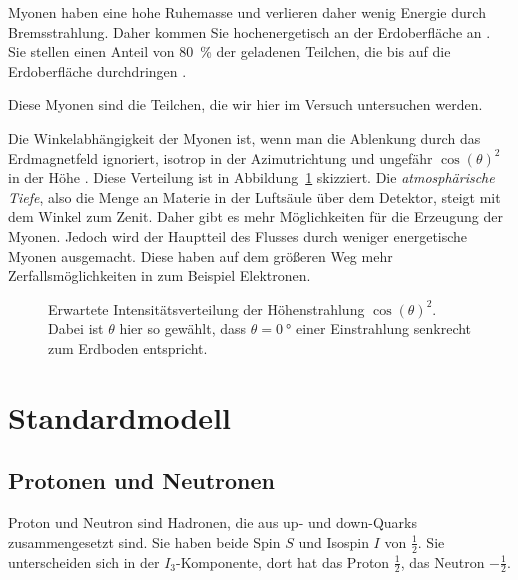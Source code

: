 \documentclass[11pt, ngerman, fleqn, DIV=15, headinclude, BCOR=2cm]{scrreprt}
\begin{document}
Myonen haben eine hohe Ruhemasse und verlieren
daher wenig Energie durch Bremsstrahlung. Daher kommen Sie hochenergetisch an
der Erdoberfläche an \parencite[984]{meschede-gerthsen_24}. Sie stellen einen
Anteil von \SI{80}{\percent} der geladenen Teilchen, die bis auf die
Erdoberfläche durchdringen \parencite[111]{Grupen/Astroteilchenphysik}.

Diese Myonen sind die Teilchen, die wir hier im Versuch untersuchen werden.

Die Winkelabhängigkeit der Myonen ist, wenn man die Ablenkung durch das
Erdmagnetfeld ignoriert, isotrop in der Azimutrichtung und ungefähr
$\cos(\theta)^2$ in der Höhe \parencite[(7.2)]{Grupen/Astroteilchenphysik}.
Diese Verteilung ist in Abbildung~\ref{fig:cos2} skizziert. Die
\emph{atmosphärische Tiefe}, also die Menge an Materie in der Luftsäule über
dem Detektor, steigt mit dem Winkel zum Zenit. Daher gibt es mehr Möglichkeiten
für die Erzeugung der Myonen. Jedoch wird der Hauptteil des Flusses durch
weniger energetische Myonen ausgemacht. Diese haben auf dem größeren Weg mehr
Zerfallsmöglichkeiten in zum Beispiel Elektronen.
\parencite[115]{Grupen/Astroteilchenphysik}

\begin{figure}[htbp]
    \centering
    \caption{%
        Erwartete Intensitätsverteilung der Höhenstrahlung $\cos(\theta)^2$.
        Dabei ist $\theta$ hier so gewählt, dass $\theta = \SI{0}{\degree}$
        einer Einstrahlung senkrecht zum Erdboden entspricht.
    }
    \label{fig:cos2}
\end{figure}

\section{Standardmodell}

\subsection{Protonen und Neutronen}

Proton und Neutron sind Hadronen, die aus up- und down-Quarks zusammengesetzt
sind. Sie haben beide Spin $S$ und Isospin $I$ von $\frac12$. Sie unterscheiden
sich in der $I_3$-Komponente, dort hat das Proton $\frac12$, das Neutron
$-\frac12$.
\end{document}
